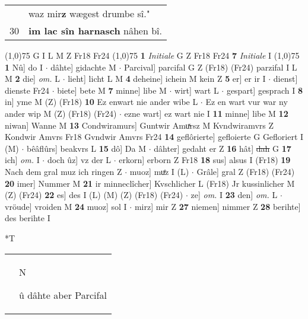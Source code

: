 \documentclass[8pt,a4paper,notitlepage]{article}
\begin{document}
\begin{table}[ht]
\begin{minipage}[t]{0.5\linewidth}
\begin{tabular}{rl}
 & waz mir\textbf{z} wægest drumbe sî."\\ 
30 & \textbf{im lac sîn harnasch} nâhen bî.\\ 
\end{tabular}
\scriptsize
\line(1,0){75} \newline
G I L M Z Fr18 Fr24 \newline
\line(1,0){75} \newline
\textbf{1} \textit{Initiale} G Z Fr18 Fr24  \textbf{7} \textit{Initiale} I  \newline
\line(1,0){75} \newline
\textbf{1} Nû] do I  $\cdot$ dâhte] gidachte M  $\cdot$ Parcival] parcifal G Z (Fr18) (Fr24) parzifal I L M \textbf{2} die] \textit{om.} L  $\cdot$ lieht] licht L M \textbf{4} deheine] ichein M kein Z \textbf{5} er] er ir I  $\cdot$ dienst] dienste Fr24  $\cdot$ biete] bete M \textbf{7} minne] libe M  $\cdot$ wirt] wart L  $\cdot$ gespart] gesprach I \textbf{8} in] yme M (Z) (Fr18) \textbf{10} Ez enwart nie ander wibe L  $\cdot$ Ez en wart vur war ny ander wip M (Z) (Fr18) (Fr24)  $\cdot$ ezne wart] ez wart nie I \textbf{11} minne] libe M \textbf{12} niwan] Wanne M \textbf{13} Condwiramurs] Guntwir Amuͯrsz M Kvndwiramvrs Z Kondwir Amvrs Fr18 Gvndwir Amvrs Fr24 \textbf{14} geflôrierte] gefloierte G Gefloriert I (M)  $\cdot$ bêâflûrs] beakvrs L \textbf{15} dô] Da M  $\cdot$ dâhter] gedaht er Z \textbf{16} hât] \sout{dah} G \textbf{17} ich] \textit{om.} I  $\cdot$ doch ûz] vz der L  $\cdot$ erkorn] erborn Z Fr18 \textbf{18} sus] alsus I (Fr18) \textbf{19} Nach dem gral muz ich ringen Z  $\cdot$ muoz] muͤz I (L)  $\cdot$ Grâle] gral Z (Fr18) (Fr24) \textbf{20} imer] Nummer M \textbf{21} ir minneclîcher] Kvschlicher L (Fr18) Jr kussinlicher M (Z) (Fr24) \textbf{22} es] des I (L) (M) (Z) (Fr18) (Fr24)  $\cdot$ ze] \textit{om.} I \textbf{23} den] \textit{om.} L  $\cdot$ vröude] vroiden M \textbf{24} muoz] sol I  $\cdot$ mirz] mir Z \textbf{27} niemen] nimmer Z \textbf{28} berihte] des berihte I \newline
\end{minipage}
\hspace{0.5cm}
\begin{minipage}[t]{0.5\linewidth}
\small
\begin{center}*T
\end{center}
\begin{tabular}{rl}
 & \begin{large}N\end{large}û dâhte aber Parcifal\\ 

\end{tabular}
\end{minipage}
\end{table}
\end{document}
